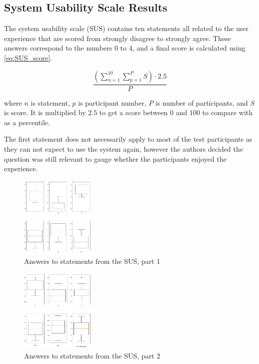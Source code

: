\graphicspath{{fake_results/}}
\subsection{System Usability Scale Results}

The system usability scale (SUS) contains ten statements all related to the user experience that are scored from strongly disagree to strongly agree. These answers correspond to the numbers 0 to 4, and a final score is calculated using \autoref{eq:SUS_score}.

\begin{equation}
	\frac{(\sum\limits_{n=1}^{10} \sum\limits_{p=1}^{P} S) \cdot 2.5 }{P}
	\label{eq:SUS_score}
\end{equation}

where $ n $ is statement, $ p $ is participant number, $ P $ is number of participants, and $ S $ is score. It is multiplied by $2.5$ to get a score between $ 0 $ and $ 100 $ to compare with as a percentile. %

The first statement does not necessarily apply to most of the test participants as they can not expect to use the system again, however the authors decided the question was still relevant to gauge whether the participants enjoyed the experience. 

\begin{figure}[h]
\centering
\includegraphics[width=0.32\textwidth]{Page1.png}
\caption{Answers to statements from the SUS, part 1}
\label{fig:one}
\end{figure}

\begin{figure}[h]
\centering
\includegraphics[width=0.32\textwidth]{Page2.png}
\caption{Answers to statements from the SUS, part 2}
\label{fig:two}
\end{figure}


